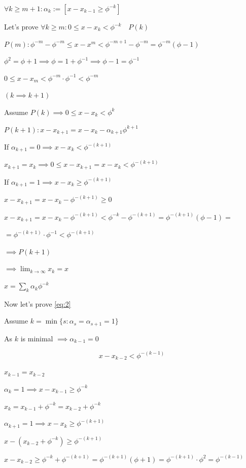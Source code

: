 \documentclass{article}
\begin{document}
\( \forall k \geq m + 1: \alpha_{k} := [x-x_{k-1} \geq \phi^{-k}] \)

Let's prove \( \forall k \geq m: 0 \leq x - x_k < \phi^{-k} \quad P(k) \)

\( P(m): \phi^{-m} - \phi^{-m} \leq x - x^m < \phi^{-m+1} - \phi^{-m} = \phi^{-m}(\phi - 1) \)

\( \phi^2 = \phi + 1 \implies \phi = 1 + \phi^{-1} \implies \phi - 1 = \phi^{-1} \)

\( 0 \leq x - x_m < \phi^{-m}\cdot\phi^{-1} < \phi^{-m} \)

\( (k \implies k + 1) \)

Assume \( P(k) \implies 0 \leq x - x_k < \phi^{k} \)

\( P(k+1): x - x_{k+1} = x-x_k - \alpha_{k+1}\phi^{k+1} \)

If \( \alpha_{k+1} = 0 \implies x - x_k < \phi^{-(k+1)} \)

\( x_{k+1} = x_k \implies 0 \leq x - x_{k+1} = x - x_k < \phi^{-(k+1)} \)

If \( \alpha_{k+1} = 1 \implies x - x_k \geq \phi^{-(k+1)} \)

\( x - x_{k+1} = x - x_k - \phi^{-(k+1)} \geq 0 \)

\( x - x_{k+1} = x - x_k - \phi^{-(k+1)} < \phi^{-k} - \phi^{-(k+1)} = \phi^{-(k+1)} (\phi - 1) = \)

\( = \phi^{-(k+1)} \cdot \phi^{-1} < \phi^{-(k+1)} \)

\( \implies P(k+1) \)

\( \implies \lim_{k \to \infty} x_k = x \)

\( x = \sum_{k} \alpha_k \phi^{-k} \)

Now let's prove \eqref{eq:2}

Assume \( k = \min \{ s: \alpha_s = \alpha_{s+1} = 1 \} \)

As \( k \) is minimal \( \implies \alpha_{k-1} = 0 \)

\[x - x_{k-2} < \phi^{-(k-1)} \tag{4}\label{eq:4}\]

\( x_{k-1} = x_{k-2} \)

\( \alpha_k = 1 \implies x - x_{k-1} \geq \phi^{-k} \)

\( x_k = x_{k-1} + \phi^{-k} = x_{k-2} + \phi^{-k} \)

\( \alpha_{k+1} = 1 \implies x - x_{k} \geq \phi^{-(k+1)} \)

\( x - (x_{k-2} + \phi^{-k}) \geq \phi^{-(k+1)} \)

\( x - x_{k-2} \geq \phi^{-k} + \phi^{-(k+1)} = \phi^{-(k+1)}(\phi + 1) =  \phi^{-(k+1)} \cdot \phi^2 = \phi^{-(k-1)} \)
\end{document}

